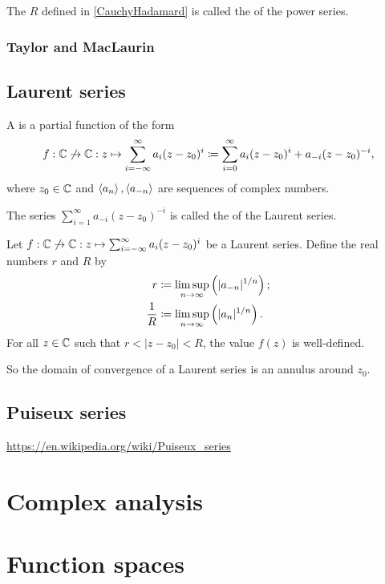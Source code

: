 \begin{definition}
The $R$ defined in \ref{CauchyHadamard} is called the  of the power series.
\end{definition}

\subsection{Taylor and MacLaurin}
\section{Laurent series}
\begin{definition}
A  is a partial function of the form
\[ f: \mathbb{C}\not\to \mathbb{C}: z\mapsto \sum_{i=-\infty}^\infty a_i(z-z_0)^i \coloneqq \sum_{i=0}^\infty a_i(z-z_0)^i + a_{-i}(z-z_0)^{-i}, \]
where $z_0\in \mathbb{C}$ and $\left\langle a_n \right\rangle, \left\langle a_{-n} \right\rangle$ are sequences of complex numbers.

The series $\sum_{i=1}^\infty a_{-i}(z-z_0)^{-i}$ is called the  of the Laurent series.
\end{definition}

\begin{proposition} \label{LaurentSeriesConvergence}
Let $f: \mathbb{C}\not\to \mathbb{C}: z\mapsto \sum_{i=-\infty}^\infty a_i(z-z_0)^i$ be a Laurent series. Define the real numbers $r$ and $R$ by
\begin{align*}
r &\coloneqq \limsup_{n\to\infty}\left(|a_{-n}|^{1/n}\right); \\
\frac{1}{R} &\coloneqq \limsup_{n\to\infty}\left(|a_n|^{1/n}\right).
\end{align*}
For all $z\in \mathbb{C}$ such that $r < |z-z_0| < R$, the value $f(z)$ is well-defined.
\end{proposition}
So the domain of convergence of a Laurent series is an annulus around $z_0$.

\section{Puiseux series}
\url{https://en.wikipedia.org/wiki/Puiseux_series}

\chapter{Complex analysis}


\chapter{Function spaces}

